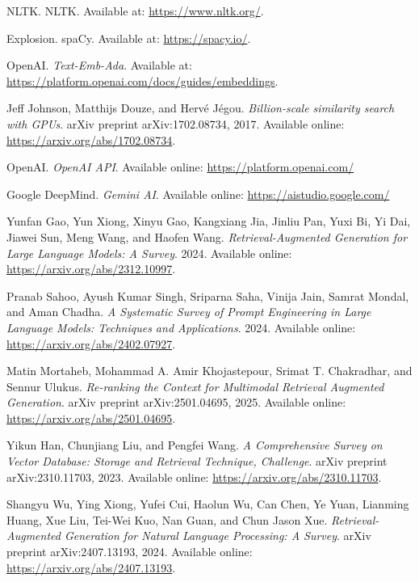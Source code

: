 \documentclass{article}
\begin{document}
\begin{thebibliography}{99}
NLTK.
NLTK. 
Available at: \url{https://www.nltk.org/}.

Explosion. 
spaCy. 
Available at: \url{https://spacy.io/}.

OpenAI.
\textit{Text-Emb-Ada}. 
Available at: \url{https://platform.openai.com/docs/guides/embeddings}.

Jeff Johnson, Matthijs Douze, and Hervé Jégou. 
\textit{Billion-scale similarity search with GPUs}. 
arXiv preprint arXiv:1702.08734, 2017. 
Available online: \url{https://arxiv.org/abs/1702.08734}.

OpenAI. 
\textit{OpenAI API}. 
Available online: \url{https://platform.openai.com/}

Google DeepMind. 
\textit{Gemini AI}. 
Available online: \url{https://aistudio.google.com/}

Yunfan Gao, Yun Xiong, Xinyu Gao, Kangxiang Jia, Jinliu Pan, Yuxi Bi, Yi Dai, Jiawei Sun, Meng Wang, and Haofen Wang. 
\textit{Retrieval-Augmented Generation for Large Language Models: A Survey}. 
2024. Available online: \url{https://arxiv.org/abs/2312.10997}.

Pranab Sahoo, Ayush Kumar Singh, Sriparna Saha, Vinija Jain, Samrat Mondal, and Aman Chadha. 
\textit{A Systematic Survey of Prompt Engineering in Large Language Models: Techniques and Applications}. 
2024. Available online: \url{https://arxiv.org/abs/2402.07927}.

Matin Mortaheb, Mohammad A. Amir Khojastepour, Srimat T. Chakradhar, and Sennur Ulukus. 
\textit{Re-ranking the Context for Multimodal Retrieval Augmented Generation}. 
arXiv preprint arXiv:2501.04695, 2025. 
Available online: \url{https://arxiv.org/abs/2501.04695}.

Yikun Han, Chunjiang Liu, and Pengfei Wang. 
\textit{A Comprehensive Survey on Vector Database: Storage and Retrieval Technique, Challenge}. 
arXiv preprint arXiv:2310.11703, 2023. 
Available online: \url{https://arxiv.org/abs/2310.11703}.

Shangyu Wu, Ying Xiong, Yufei Cui, Haolun Wu, Can Chen, Ye Yuan, Lianming Huang, Xue Liu, Tei-Wei Kuo, Nan Guan, and Chun Jason Xue. 
\textit{Retrieval-Augmented Generation for Natural Language Processing: A Survey}. 
arXiv preprint arXiv:2407.13193, 2024. 
Available online: \url{https://arxiv.org/abs/2407.13193}.

\end{thebibliography}
\end{document}

